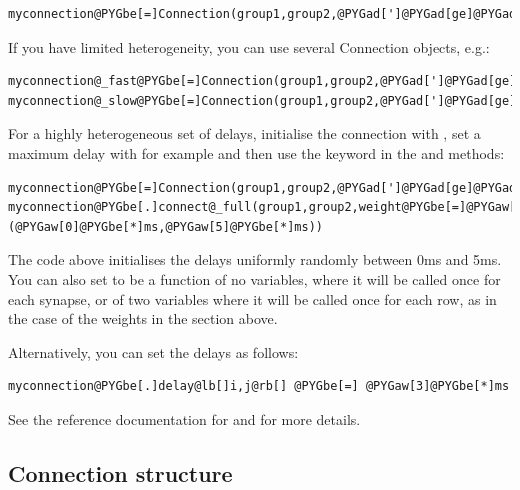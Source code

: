 \documentclass[letterpaper,10pt,english]{manual}
\begin{document}
\begin{Verbatim}[commandchars=@\[\]]
myconnection@PYGbe[=]Connection(group1,group2,@PYGad[']@PYGad[ge]@PYGad['],delay@PYGbe[=]@PYGaw[3]@PYGbe[*]ms)
\end{Verbatim}

If you have limited heterogeneity, you can use several Connection objects, e.g.:

\begin{Verbatim}[commandchars=@\[\]]
myconnection@_fast@PYGbe[=]Connection(group1,group2,@PYGad[']@PYGad[ge]@PYGad['],delay@PYGbe[=]@PYGaw[1]@PYGbe[*]ms)
myconnection@_slow@PYGbe[=]Connection(group1,group2,@PYGad[']@PYGad[ge]@PYGad['],delay@PYGbe[=]@PYGaw[5]@PYGbe[*]ms)
\end{Verbatim}

For a highly heterogeneous set of delays, initialise the connection with , set
a maximum delay with for example  and
then use the  keyword in the  and
 methods:

\begin{Verbatim}[commandchars=@\[\]]
myconnection@PYGbe[=]Connection(group1,group2,@PYGad[']@PYGad[ge]@PYGad['],delay@PYGbe[=]@PYGaA[True],max@_delay@PYGbe[=]@PYGaw[5]@PYGbe[*]ms)
myconnection@PYGbe[.]connect@_full(group1,group2,weight@PYGbe[=]@PYGaw[3]@PYGbe[*]nS,delay@PYGbe[=](@PYGaw[0]@PYGbe[*]ms,@PYGaw[5]@PYGbe[*]ms))
\end{Verbatim}

The code above initialises the delays uniformly randomly between 0ms and 5ms. You can also
set  to be a function of no variables, where it will be called once for each synapse,
or of two variables  where it will be called once for each row, as in the case of the
weights in the section above.

Alternatively, you can set the delays as follows:

\begin{Verbatim}[commandchars=@\[\]]
myconnection@PYGbe[.]delay@lb[]i,j@rb[] @PYGbe[=] @PYGaw[3]@PYGbe[*]ms
\end{Verbatim}

See the reference documentation for \hyperlink{brian.Connection}{} and \hyperlink{brian.DelayConnection}{} for
more details.


\subsection{Connection structure}
\end{document}
